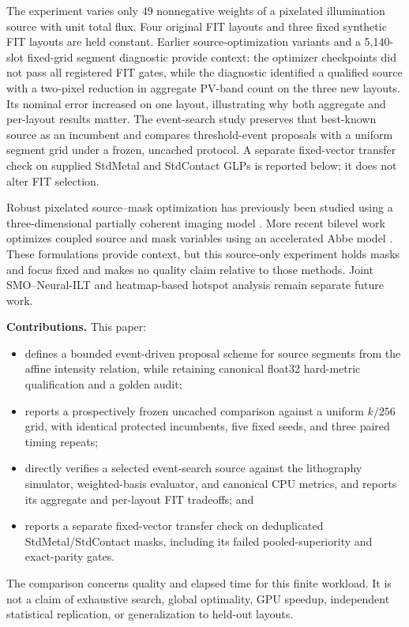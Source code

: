 \documentclass[conference]{IEEEtran}
\begin{document}
The experiment varies only 49 nonnegative weights of a pixelated illumination source with unit total flux. Four original FIT layouts and three fixed synthetic FIT layouts are held constant. Earlier source-optimization variants and a 5,140-slot fixed-grid segment diagnostic provide context: the optimizer checkpoints did not pass all registered FIT gates, while the diagnostic identified a qualified source with a two-pixel reduction in aggregate PV-band count on the three new layouts. Its nominal error increased on one layout, illustrating why both aggregate and per-layout results matter. The event-search study preserves that best-known source as an incumbent and compares threshold-event proposals with a uniform segment grid under a frozen, uncached protocol. A separate fixed-vector transfer check on supplied StdMetal and StdContact GLPs is reported below; it does not alter FIT selection.

Robust pixelated source--mask optimization has previously been studied using a three-dimensional partially coherent imaging model \cite{robustsmo}. More recent bilevel work optimizes coupled source and mask variables using an accelerated Abbe model \cite{bismo}. These formulations provide context, but this source-only experiment holds masks and focus fixed and makes no quality claim relative to those methods. Joint SMO--Neural-ILT and heatmap-based hotspot analysis remain separate future work.

\medskip
\noindent\textbf{Contributions.} This paper:
\begin{itemize}
    \item defines a bounded event-driven proposal scheme for source segments from the affine intensity relation, while retaining canonical float32 hard-metric qualification and a golden audit;
    \item reports a prospectively frozen uncached comparison against a uniform $k/256$ grid, with identical protected incumbents, five fixed seeds, and three paired timing repeats;
    \item directly verifies a selected event-search source against the lithography simulator, weighted-basis evaluator, and canonical CPU metrics, and reports its aggregate and per-layout FIT tradeoffs; and
    \item reports a separate fixed-vector transfer check on deduplicated StdMetal/StdContact masks, including its failed pooled-superiority and exact-parity gates.
\end{itemize}
The comparison concerns quality and elapsed time for this finite workload. It is not a claim of exhaustive search, global optimality, GPU speedup, independent statistical replication, or generalization to held-out layouts.
\end{document}
